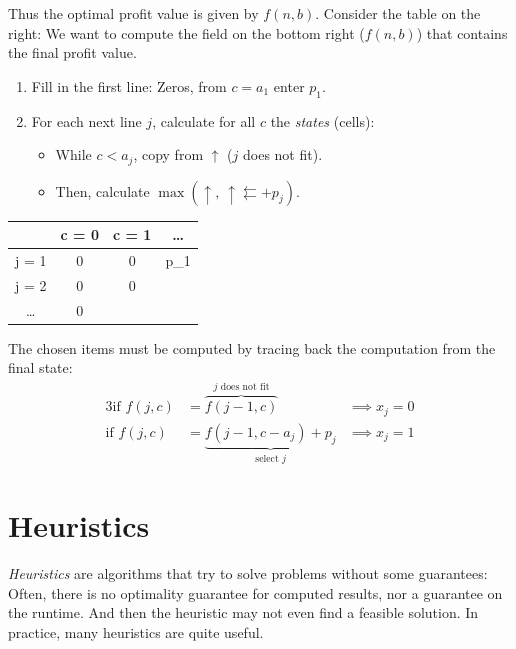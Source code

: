 \documentclass[english]{panikzettel}
\begin{document}
\begin{minipage}[t]{0.6\textwidth}
	Thus the optimal profit value is given by $f(n,b)$.
	Consider the table on the right: We want to compute the field on the bottom right ($f(n,b)$) that contains the final profit value.
	\begin{enumerate}
		\item Fill in the first line: Zeros, from $c = a_1$ enter $p_1$.
		\item For each next line $j$, calculate for all $c$ the \emph{states} (cells):
		      \begin{itemize}
			      \item While $c < a_j$, copy from $\uparrow$ ($j$ does not fit).
			      \item Then, calculate $\max(\uparrow,~ \uparrow \leftleftarrows + p_j)$.
		      \end{itemize}
	\end{enumerate}
\end{minipage}\hfil%
\begin{minipage}[t]{0.35\textwidth}
	\centering
	\vspace{0\baselineskip}
	\begin{tabular}{C|C|C|C}
		       & c = 0 & c = 1 & \ldots \\ \hline
		j = 1  & 0     & 0     & p_1    \\ \hline
		j = 2  & 0     & 0     &        \\ \hline
		\ldots & 0     &       &
	\end{tabular}
\end{minipage}
\medskip

The chosen items must be computed by tracing back the computation from the final state:
\begin{alignat*}{3}
	\text{if } f(j,c) & = \overbrace{f(j-1,c)}^\text{$j$ does not fit}    & \implies x_j = 0 \\
	\text{if } f(j,c) & = \underbrace{f(j-1,c-a_j)+p_j}_\text{select $j$} & \implies x_j = 1
\end{alignat*}

\section{Heuristics}

\emph{Heuristics} are algorithms that try to solve problems without some guarantees:
Often, there is no optimality guarantee for computed results, nor a guarantee on the runtime.
And then the heuristic may not even find a feasible solution.
In practice, many heuristics are quite useful.
\end{document}
